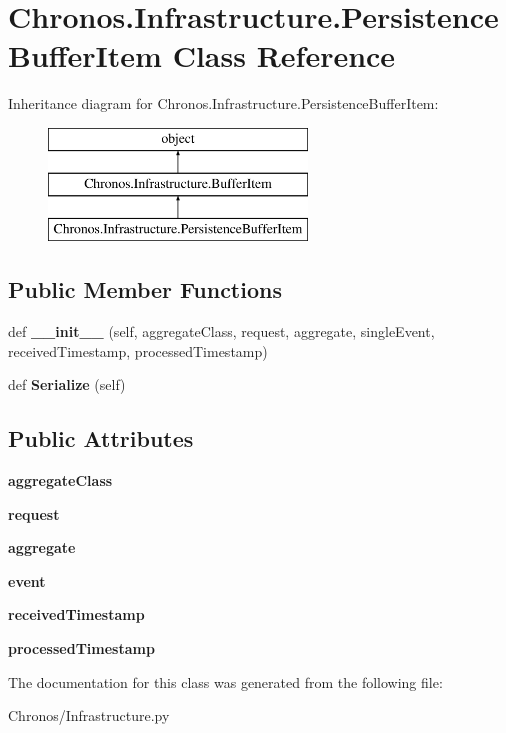 \hypertarget{classChronos_1_1Infrastructure_1_1PersistenceBufferItem}{}\section{Chronos.\+Infrastructure.\+Persistence\+Buffer\+Item Class Reference}
\label{classChronos_1_1Infrastructure_1_1PersistenceBufferItem}
Inheritance diagram for Chronos.\+Infrastructure.\+Persistence\+Buffer\+Item\+:\begin{figure}[H]
\begin{center}
\leavevmode
\includegraphics[height=3.000000cm]{classChronos_1_1Infrastructure_1_1PersistenceBufferItem}
\end{center}
\end{figure}
\subsection*{Public Member Functions}
\begin{DoxyCompactItemize}
\item 
def {\bfseries \+\_\+\+\_\+init\+\_\+\+\_\+} (self, aggregate\+Class, request, aggregate, single\+Event, received\+Timestamp, processed\+Timestamp)
\item 
def {\bfseries Serialize} (self)
\end{DoxyCompactItemize}
\subsection*{Public Attributes}
\begin{DoxyCompactItemize}
\item 
{\bfseries aggregate\+Class}
\item 
{\bfseries request}
\item 
{\bfseries aggregate}
\item 
{\bfseries event}
\item 
{\bfseries received\+Timestamp}
\item 
{\bfseries processed\+Timestamp}
\end{DoxyCompactItemize}


The documentation for this class was generated from the following file\+:\begin{DoxyCompactItemize}
\item 
Chronos/Infrastructure.\+py\end{DoxyCompactItemize}
